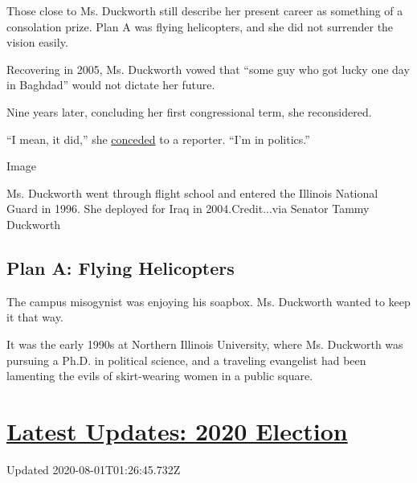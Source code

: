 Those close to Ms. Duckworth still describe her present career as
something of a consolation prize. Plan A was flying helicopters, and she
did not surrender the vision easily.

Recovering in 2005, Ms. Duckworth vowed that ``some guy who got lucky
one day in Baghdad'' would not dictate her future.

Nine years later, concluding her first congressional term, she
reconsidered.

``I mean, it did,'' she
\href{https://www.dailyherald.com/article/20141111/news/141119763}{conceded}
to a reporter. ``I'm in politics.''

Image

Ms. Duckworth went through flight school and entered the Illinois
National Guard in 1996. She deployed for Iraq in 2004.Credit...via
Senator Tammy Duckworth

\hypertarget{plan-a-flying-helicopters}{%
\subsection{Plan A: Flying
Helicopters}\label{plan-a-flying-helicopters}}

The campus misogynist was enjoying his soapbox. Ms. Duckworth wanted to
keep it that way.

It was the early 1990s at Northern Illinois University, where Ms.
Duckworth was pursuing a Ph.D. in political science, and a traveling
evangelist had been lamenting the evils of skirt-wearing women in a
public square.

\hypertarget{latest-updates-2020-election}{%
\section{\texorpdfstring{\href{https://www.nytimes3xbfgragh.onion/2020/07/31/us/elections/biden-vs-trump.html?action=click\&pgtype=Article\&state=default\&region=MAIN_CONTENT_1\&context=storylines_live_updates}{Latest
Updates: 2020
Election}}{Latest Updates: 2020 Election}}\label{latest-updates-2020-election}}

Updated 2020-08-01T01:26:45.732Z

